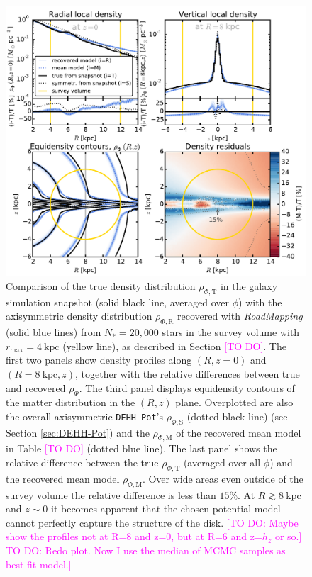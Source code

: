 \documentclass[iop,revtex4,numberedappendix,appendixfloats]{emulateapj}
\newcommand{\RM}{{\sl RoadMapping}}
\newcommand{\Wilma}[1]{\textcolor{Magenta}{#1}}
\begin{document}
\begin{figure}[!htbp]
\centering
\includegraphics[width=\columnwidth]{fig/MNdHHdiffSph2_4kpc8Spiral_a_test1_density_overview.pdf}
\caption{Comparison of the true density distribution $\rho_{\Phi,\text{T}}$ in the galaxy simulation snapshot (solid black line, averaged over $\phi$) with the axisymmetric density distribution $\rho_{\Phi,\text{R}}$ recovered with \RM{} (solid blue lines) from $N_*=20,000$ stars in the survey volume with $r_\text{max}=4~\text{kpc}$ (yellow line), as described in Section \Wilma{[TO DO]}. The first two panels show density profiles along $(R,z=0)$ and $(R=8~\text{kpc},z)$, together with the relative differences between true and recovered $\rho_{\Phi}$. The third panel displays equidensity contours of the matter distribution in the $(R,z)$ plane. Overplotted are also the overall axisymmetric \texttt{DEHH-Pot}'s $\rho_{\Phi,\text{S}}$ (dotted black line) (see Section \ref{sec:DEHH-Pot}) and the $\rho_{\Phi,\text{M}}$ of the recovered mean model in Table \Wilma{[TO DO]} (dotted blue line). The last panel shows the relative difference between the true $\rho_{\Phi,\text{T}}$ (averaged over all $\phi$) and the recovered mean model $\rho_{\Phi,\text{M}}$. Over wide areas even outside of the survey volume the relative difference is less than $15\%$. At $R\gtrsim8~\text{kpc}$ and $z\sim0$ it becomes apparent that the chosen potential model cannot perfectly capture the structure of the disk. \Wilma{[TO DO: Maybe show the profiles not at R=8 and z=0, but at R=6 and z=$h_z$ or so.]} \Wilma{TO DO: Redo plot. Now I use the median of MCMC samples as best fit model.]}}
\label{fig:4kpc8Spiral_density}
\end{figure}
\end{document}
